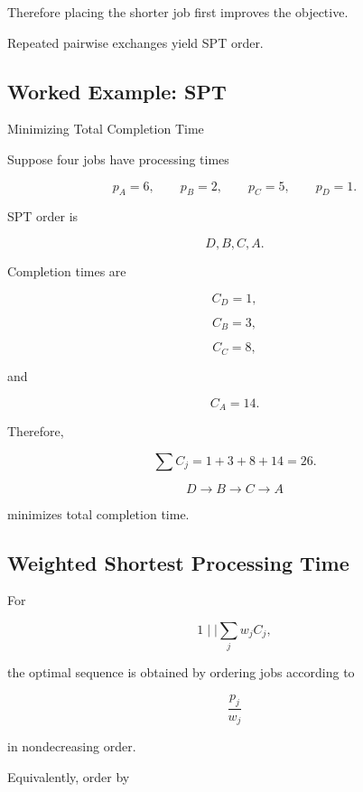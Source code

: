 Therefore placing the shorter job first improves the objective.

Repeated pairwise exchanges yield SPT order.

\subsection{Worked Example: SPT}
\label{subsec:worked-spt}

\begin{workedexamplebox}{Minimizing Total Completion Time}

Suppose four jobs have processing times

\[
p_A=6,
\qquad
p_B=2,
\qquad
p_C=5,
\qquad
p_D=1.
\]

SPT order is

\[
D,B,C,A.
\]

Completion times are

\[
C_D=1,
\]

\[
C_B=3,
\]

\[
C_C=8,
\]

and

\[
C_A=14.
\]

Therefore,

\[
\sum C_j
=
1+3+8+14
=
26.
\]

\begin{answerbox}
\[
\boxed{
D\to B\to C\to A
}
\]

minimizes total completion time.
\end{answerbox}

\end{workedexamplebox}

\subsection{Weighted Shortest Processing Time}
\label{subsec:wspt-rule}

For

\[
\boxed{
1\mid\mid\sum_jw_jC_j,
}
\]

the optimal sequence is obtained by ordering jobs according to

\[
\boxed{
\frac{p_j}{w_j}
}
\]

in nondecreasing order.

Equivalently, order by

